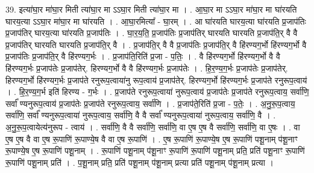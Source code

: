 \documentclass[17pt]{extarticle}
\begin{document}
39. इत्या॑घा॒र मा॑घा॒र मिती त्या॑घा॒र मा ऽऽघा॒र मिती त्या॑घा॒र मा । . आ॒घा॒र मा ऽऽघा॒र मा॑घा॒र मा घा॑रयति घारय॒त्या ऽऽघा॒र मा॑घा॒र मा घा॑रयति । . आ॒घा॒रमित्या᳚ - घा॒रम् । . आ घा॑रयति घारय॒त्या घा॑रयति प्र॒जाप॑तिः प्र॒जाप॑तिर् घारय॒त्या घा॑रयति प्र॒जाप॑तिः । . घा॒र॒य॒ति॒ प्र॒जाप॑तिः प्र॒जाप॑तिर् घारयति घारयति प्र॒जाप॑ति॒र् वै वै प्र॒जाप॑तिर् घारयति घारयति प्र॒जाप॑ति॒र् वै । . प्र॒जाप॑ति॒र् वै वै प्र॒जाप॑तिः प्र॒जाप॑ति॒र् वै हि॑रण्यग॒र्भो हि॑रण्यग॒र्भो वै प्र॒जाप॑तिः प्र॒जाप॑ति॒र् वै हि॑रण्यग॒र्भः । . प्र॒जाप॑ति॒रिति॑ प्र॒जा - प॒तिः॒ । . वै हि॑रण्यग॒र्भो हि॑रण्यग॒र्भो वै वै हि॑रण्यग॒र्भः प्र॒जाप॑तेः प्र॒जाप॑तेर्. हिरण्यग॒र्भो वै वै हि॑रण्यग॒र्भः प्र॒जाप॑तेः । . हि॒र॒ण्य॒ग॒र्भः प्र॒जाप॑तेः प्र॒जाप॑तेर्. हिरण्यग॒र्भो हि॑रण्यग॒र्भः प्र॒जाप॑ते रनुरूप॒त्वाया॑नु रूप॒त्वाय॑ प्र॒जाप॑तेर्. हिरण्यग॒र्भो हि॑रण्यग॒र्भः प्र॒जाप॑ते रनुरूप॒त्वाय॑ । . हि॒र॒ण्य॒ग॒र्भ इति॑ हिरण्य - ग॒र्भः । . प्र॒जाप॑ते रनुरूप॒त्वाया॑ नुरूप॒त्वाय॑ प्र॒जाप॑तेः प्र॒जाप॑ते रनुरूप॒त्वाय॒ सर्वा॑णि॒ सर्वा᳚
ण्यनुरूप॒त्वाय॑ प्र॒जाप॑तेः प्र॒जाप॑ते रनुरूप॒त्वाय॒ सर्वा॑णि । . प्र॒जाप॑ते॒रिति॑ प्र॒जा - प॒तेः॒ । . अ॒नु॒रू॒प॒त्वाय॒ सर्वा॑णि॒ सर्वा᳚ ण्यनुरूप॒त्वाया॑ नुरूप॒त्वाय॒ सर्वा॑णि॒ वै वै सर्वा᳚ ण्यनुरूप॒त्वाया॑ नुरूप॒त्वाय॒ सर्वा॑णि॒ वै । . अ॒नु॒रू॒प॒त्वायेत्य॑नुरूप - त्वाय॑ । . सर्वा॑णि॒ वै वै सर्वा॑णि॒ सर्वा॑णि॒ वा ए॒ष ए॒ष वै सर्वा॑णि॒ सर्वा॑णि॒ वा ए॒षः । . वा ए॒ष ए॒ष वै वा ए॒ष रू॒पाणि॑ रू॒पाण्ये॒ष वै वा ए॒ष रू॒पाणि॑ । . ए॒ष रू॒पाणि॑ रू॒पाण्ये॒ष ए॒ष रू॒पाणि॑ पशू॒नाम् प॑शू॒नाꣳ रू॒पाण्ये॒ष ए॒ष रू॒पाणि॑ पशू॒नाम् । . रू॒पाणि॑ पशू॒नाम् प॑शू॒नाꣳ रू॒पाणि॑ रू॒पाणि॑ पशू॒नाम् प्रति॒ प्रति॑ पशू॒नाꣳ रू॒पाणि॑ रू॒पाणि॑ पशू॒नाम् प्रति॑ । . प॒शू॒नाम् प्रति॒ प्रति॑ पशू॒नाम् प॑शू॒नाम् प्रत्या प्रति॑ पशू॒नाम् प॑शू॒नाम् प्रत्या । \newline
\end{document}
